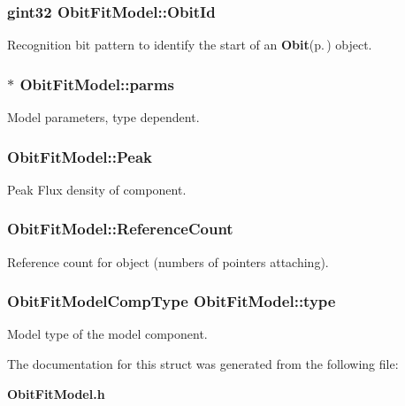 \subsubsection{\setlength{\rightskip}{0pt plus 5cm}gint32 {\bf Obit\-Fit\-Model::Obit\-Id}}\label{structObitFitModel_o0}


Recognition bit pattern to identify the start of an {\bf Obit}{\rm (p.\,\pageref{structObit})} object. 

\subsubsection{$\ast$ {\bf Obit\-Fit\-Model::parms}}\label{structObitFitModel_o9}


Model parameters, type dependent. 

\subsubsection{ {\bf Obit\-Fit\-Model::Peak}}\label{structObitFitModel_o5}


Peak Flux density of component. 

\subsubsection{ {\bf Obit\-Fit\-Model::Reference\-Count}}\label{structObitFitModel_o2}


Reference count for object (numbers of pointers attaching). 

\subsubsection{\setlength{\rightskip}{0pt plus 5cm}Obit\-Fit\-Model\-Comp\-Type {\bf Obit\-Fit\-Model::type}}\label{structObitFitModel_o4}


Model type of the model component. 



The documentation for this struct was generated from the following file:\begin{CompactItemize}
\item 
{\bf Obit\-Fit\-Model.h}\end{CompactItemize}
